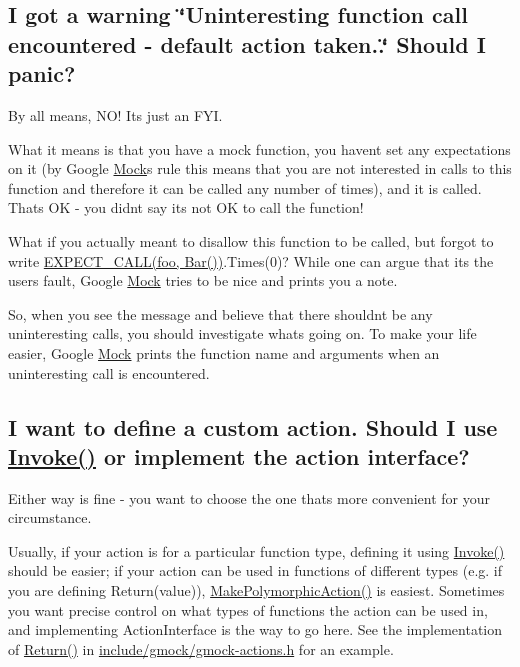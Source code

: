 \subsection*{I got a warning \char`\"{}\+Uninteresting function call encountered -\/ default action taken..\char`\"{} Should I panic?}

By all means, N\+O! It\textquotesingle{}s just an F\+YI.

What it means is that you have a mock function, you haven\textquotesingle{}t set any expectations on it (by Google \hyperlink{class_mock}{Mock}\textquotesingle{}s rule this means that you are not interested in calls to this function and therefore it can be called any number of times), and it is called. That\textquotesingle{}s OK -\/ you didn\textquotesingle{}t say it\textquotesingle{}s not OK to call the function!

What if you actually meant to disallow this function to be called, but forgot to write {\ttfamily \hyperlink{gmock-spec-builders_8h_a535a6156de72c1a2e25a127e38ee5232}{E\+X\+P\+E\+C\+T\+\_\+\+C\+A\+L\+L(foo, Bar())}.Times(0)}? While one can argue that it\textquotesingle{}s the user\textquotesingle{}s fault, Google \hyperlink{class_mock}{Mock} tries to be nice and prints you a note.

So, when you see the message and believe that there shouldn\textquotesingle{}t be any uninteresting calls, you should investigate what\textquotesingle{}s going on. To make your life easier, Google \hyperlink{class_mock}{Mock} prints the function name and arguments when an uninteresting call is encountered.

\subsection*{I want to define a custom action. Should I use \hyperlink{namespacetesting_a12aebaf8363d49a383047529f798b694}{Invoke()} or implement the action interface?}

Either way is fine -\/ you want to choose the one that\textquotesingle{}s more convenient for your circumstance.

Usually, if your action is for a particular function type, defining it using {\ttfamily \hyperlink{namespacetesting_a12aebaf8363d49a383047529f798b694}{Invoke()}} should be easier; if your action can be used in functions of different types (e.\+g. if you are defining {\ttfamily Return(value)}), {\ttfamily \hyperlink{namespacetesting_a36bd06c5ea972c6df0bd9f40a7a94c65}{Make\+Polymorphic\+Action()}} is easiest. Sometimes you want precise control on what types of functions the action can be used in, and implementing {\ttfamily Action\+Interface} is the way to go here. See the implementation of {\ttfamily \hyperlink{namespacetesting_af6d1c13e9376c77671e37545cd84359c}{Return()}} in {\ttfamily \hyperlink{gmock-actions_8h}{include/gmock/gmock-\/actions.\+h}} for an example.

